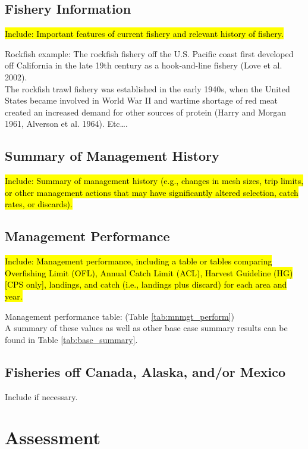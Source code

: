 \documentclass[12pt,]{article}
\begin{document}
\subsection{Fishery Information}\label{fishery-information}

\hl{Include: Important features of current fishery and relevant history of fishery.}

Rockfish example: The rockfish fishery off the U.S. Pacific coast first
developed off California in the late 19th century as a hook-and-line
fishery (Love et al. 2002).\\
The rockfish trawl fishery was established in the early 1940s, when the
United States became involved in World War II and wartime shortage of
red meat created an increased demand for other sources of protein (Harry
and Morgan 1961, Alverson et al. 1964). Etc\ldots{}.

\subsection{Summary of Management
History}\label{summary-of-management-history}

\hl{Include: Summary of management history (e.g., changes in mesh sizes, trip 
limits, or other management actions that may have significantly altered selection, 
catch rates, or discards).}

\subsection{Management Performance}\label{management-performance-1}

\hl{Include: Management performance, including a table or tables comparing 
Overfishing Limit (OFL), Annual Catch Limit (ACL), Harvest Guideline (HG) 
[CPS only], landings, and catch (i.e., landings plus discard) for each area and year.}

Management performance table: (Table \ref{tab:mnmgt_perform})\\
A summary of these values as well as other base case summary results can
be found in Table \ref{tab:base_summary}.

\subsection{Fisheries off Canada, Alaska, and/or
Mexico}\label{fisheries-off-canada-alaska-andor-mexico}

Include if necessary.

\section{Assessment}\label{assessment}
\end{document}
